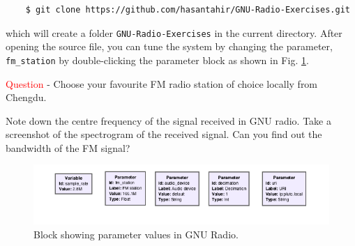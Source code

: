 \documentclass[11pt]{article}
\begin{document}
\begin{mdframed}[backgroundcolor=gray!20]
  \tiny
  \begin{verbatim}
    $ git clone https://github.com/hasantahir/GNU-Radio-Exercises.git
  \end{verbatim}
\end{mdframed}

which will create a folder \texttt{GNU-Radio-Exercises} in the current directory. After opening the source file, you can tune the system by changing the parameter, \texttt{fm\_station} by double-clicking the parameter block as shown in Fig. \ref{fig:gnu_radio}. 

\begin{tcolorbox}[colback=green!5]
  \textcolor{red}{Question} - Choose your favourite FM radio station of choice locally from Chengdu. 
  \begin{outline}
    \1 Note down the centre frequency of the signal received in GNU radio.
    \1 Take a screenshot of the spectrogram of the received signal.
    \1 Can you find out the bandwidth of the FM signal?
  \end{outline}
\end{tcolorbox}


\begin{figure}[h!]
  \centering
  \includegraphics[width=\textwidth]{GNu Radio screenshot.png}
  \caption{Block showing parameter values in GNU Radio.}
  \label{fig:gnu_radio}
\end{figure}






\end{document}
